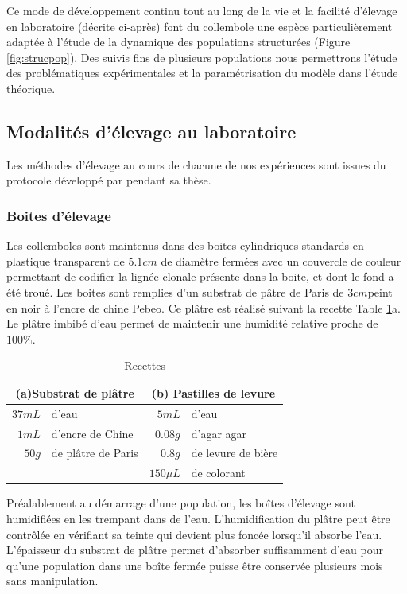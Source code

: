 Ce mode de développement continu tout au long de la vie et la facilité
d'élevage en laboratoire (décrite ci-après) font du collembole une espèce
particulièrement adaptée à l'étude de la dynamique des populations structurées
(Figure \ref{fig:strucpop}).
Des suivis fins de plusieurs populations nous permettrons l'étude des
problématiques expérimentales et la paramétrisation du modèle dans l'étude
théorique. 

\subsection{Modalités d'élevage au laboratoire}

Les méthodes d'élevage au cours de chacune de nos expériences sont issues du
protocole développé par \textcites{tully2004a} pendant sa thèse.

\subsubsection{Boites d'élevage}

Les collemboles sont maintenus dans des boites cylindriques standards en
plastique transparent de $5.1 cm$ de diamètre fermées avec un couvercle de
couleur permettant de codifier la lignée clonale présente dans la boite, et dont
le fond a été troué. Les boites sont remplies d'un substrat de pâtre de Paris de
$3cm$peint en noir à l'encre de chine Pebeo\textcopyright. Ce plâtre est réalisé
suivant la recette Table \ref{tab:recettes}a. Le plâtre imbibé d'eau permet de
maintenir une humidité relative proche de $100\%$.

\begin{table}[!h]
\begin{center}
\begin{tabular}{rl|rl}
\multicolumn{2}{c}{(a)Substrat de plâtre}&\multicolumn{2}{c}{(b) Pastilles de levure}\\
\hline 
$37mL$ & d'eau & $5mL$ & d'eau\\ 
$1mL$ & d'encre de Chine & $0.08g$ & d'agar agar \\ 
$50g$ & de plâtre de Paris & $0.8g$ & de levure de bière\\
& & $150\mu L$ & de colorant\\ 
\end{tabular} 
\caption[Recettes]{\label{tab:recettes}Recettes}
\end{center}
\end{table}

Préalablement au démarrage d'une population, les boîtes d'élevage sont
humidifiées en les trempant dans de l'eau. L'humidification du plâtre peut être
contrôlée en vérifiant sa teinte qui devient plus foncée lorsqu'il absorbe
l'eau. L'épaisseur du substrat de plâtre permet d'absorber suffisamment d'eau
pour qu'une population dans une boîte fermée puisse être conservée plusieurs
mois sans manipulation.


